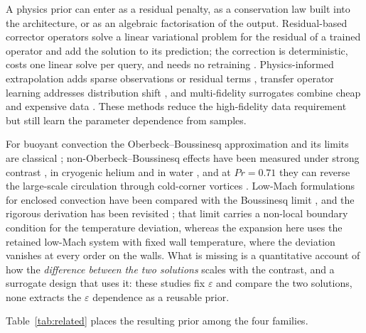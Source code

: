 \documentclass[preprint,11pt,a4paper,times,doubleblind]{elsarticle}
\begin{document}
A physics prior can enter as a residual penalty, as a conservation law built into the
architecture, or as an algebraic factorisation of the output. Residual-based corrector operators
solve a linear variational problem for the residual of a trained operator and add the solution to
its prediction; the correction is deterministic, costs one linear solve per query, and needs no
retraining \citep{jha2023residual,cao2023residual}. Physics-informed extrapolation adds sparse
observations or residual terms \citep{zhu2023reliable}, transfer operator learning addresses
distribution shift \citep{goswami2022deep}, and multi-fidelity surrogates combine cheap and
expensive data \citep{conti2022multi,chen2023feature,lyu2023multi}. These methods reduce the
high-fidelity data requirement but still learn the parameter dependence from samples.

For buoyant convection the Oberbeck--Boussinesq approximation and its limits are classical
\citep{spiegel1960boussinesq,gray1976validity,ahlers2009heat}; non-Oberbeck--Boussinesq effects
have been measured under strong contrast \citep{yik2020turbulent}, in cryogenic helium
\citep{macek2023assessing} and in water \citep{pan2023non}, and at $Pr=0.71$ they can reverse the
large-scale circulation through cold-corner vortices \citep{xia2016flow}. Low-Mach formulations for
enclosed convection have been compared with the Boussinesq limit
\citep{zhang2023investigation,satake2024mathematical}, and the rigorous derivation has been
revisited \citep{bella2023rigorous}; that limit carries a non-local boundary condition for the
temperature deviation, whereas the expansion here uses the retained low-Mach system with fixed wall
temperature, where the deviation vanishes at every order on the walls. What is missing is a
quantitative account of how the \emph{difference between the two solutions} scales with the
contrast, and a surrogate design that uses it: these studies fix $\varepsilon$ and compare the two
solutions, none extracts the $\varepsilon$ dependence as a reusable prior.

Table~\ref{tab:related} places the resulting prior among the four families.
\end{document}
